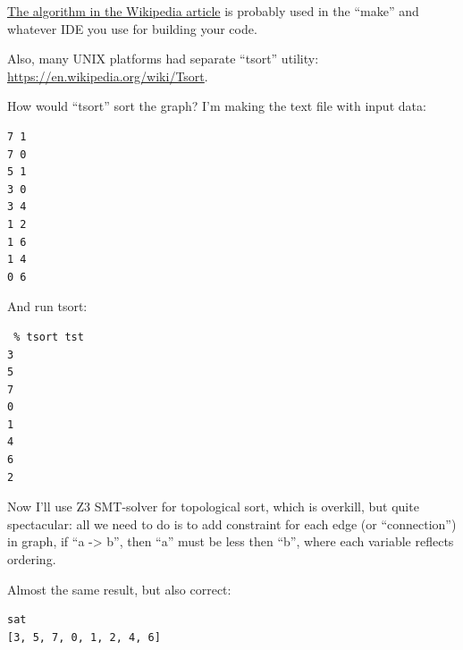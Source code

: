 \href{https://en.wikipedia.org/wiki/Topological_sorting}{The algorithm in the Wikipedia article}
is probably used in the ``make'' and whatever IDE you use for building your code.

Also, many UNIX platforms had separate ``tsort'' utility:
\url{https://en.wikipedia.org/wiki/Tsort}.

How would ``tsort'' sort the graph? I'm making the text file with input data:

\begin{lstlisting}
7 1
7 0
5 1
3 0
3 4
1 2
1 6
1 4
0 6
\end{lstlisting}

And run tsort:

\begin{lstlisting}
 % tsort tst
3
5
7
0
1
4
6
2
\end{lstlisting}

Now I'll use Z3 SMT-solver for topological sort, which is overkill, but quite spectacular: all we need to do
is to add constraint for each edge (or ``connection'') in graph, if ``a -> b'', then ``a'' must be less then ``b'', where
each variable reflects ordering.



Almost the same result, but also correct:

\begin{lstlisting}
sat
[3, 5, 7, 0, 1, 2, 4, 6]
\end{lstlisting}


